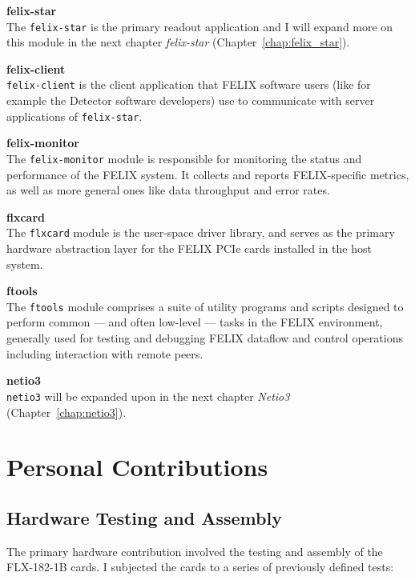 \textbf{felix-star}\\
The \texttt{felix-star} is the primary readout application and I will expand more on this module in the next chapter \emph{felix-star} (Chapter~\ref{chap:felix_star}).

\textbf{felix-client}\\
\texttt{felix-client} is the client application that \acs{FELIX} software users (like for example the Detector software developers) use to communicate with server applications of \texttt{felix-star}.

\textbf{felix-monitor}\\
The \texttt{felix-monitor} module is responsible for monitoring the status and performance of the \acs{FELIX} system. It collects and reports \acs{FELIX}-specific metrics, as well as more general ones like data throughput and error rates.

\textbf{flxcard}\\
The \texttt{flxcard} module is the user-space driver library, and serves as the primary hardware abstraction layer for the \acs{FELIX} \acs{PCIe} cards installed in the host system.

\textbf{ftools}\\
The \texttt{ftools} module comprises a suite of utility programs and scripts designed to perform common --- and often low-level --- tasks in the \acs{FELIX} environment, generally used for testing and debugging \acs{FELIX} dataflow and control operations including interaction with remote peers.

\textbf{netio3}\\
\texttt{netio3} will be expanded upon in the next chapter \emph{Netio3} (Chapter~\ref{chap:netio3}).

\clearpage
\section{Personal Contributions}

\subsection{Hardware Testing and Assembly}
The primary hardware contribution involved the testing and assembly of the FLX-182-1B cards. I subjected the cards to a series of previously defined tests:


